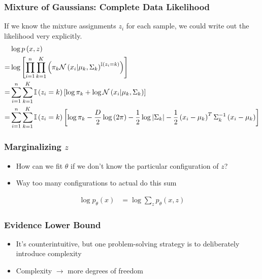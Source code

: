 \documentclass[10pt,mathserif]{beamer}
\begin{document}
\begin{frame}
  \frametitle{Mixture of Gaussians: Complete Data Likelihood}
  If we know the mixture assignments $z_i$ for each sample, we could write out
  the likelihood very explicitly.
  \begin{align*}
    &\log p\left(x, z\right) \\
    = &\log \left[\prod_{i = 1}^{n} \prod_{k = 1}^{K}
  \left(\pi_{k}\mathcal{N}\left(x_i \vert \mu_k, \Sigma_k\right)^{\mathbb{I}\left({z_i =
      k}\right)}\right)\right] \\
= &\sum_{i = 1}^{n} \sum_{k = 1}^{K} \mathbb{I}\left({z_i = k}\right) \left[\log \pi_{k} + \log
  \mathcal{N}\left(x_i \vert \mu_k, \Sigma_k\right)\right] \\
= &\sum_{i = 1}^{n} \sum_{k = 1}^{K} \mathbb{I}\left({z_i = k}\right) \left[\log \pi_{k}
  -\frac{D}{2}\log\left(2\pi\right) - \frac{1}{2}\log \left|\Sigma_k\right| -
  \frac{1}{2} \left(x_i - \mu_k\right)^{T}\Sigma^{-1}_{k} \left(x_i -
  \mu_k\right)\right]
  \end{align*}
\end{frame}

\begin{frame}
  \frametitle{Marginalizing $z$}
  \begin{itemize}
  \item How can we fit $\theta$ if we don't know the particular configuration of
    $z$?
  \item Way too many configurations to actual do this sum
  \end{itemize}
  \begin{align*}
    \log p_{\theta}\left(x\right) &= \log \sum_{z} p_{\theta}\left(x, z\right)
  \end{align*}
\end{frame}

\begin{frame}
  \frametitle{Evidence Lower Bound}
  \begin{itemize}
  \item It's counterintuitive, but one problem-solving strategy is to
    deliberately introduce complexity
  \item Complexity $\rightarrow$ more degrees of freedom
  \end{itemize}
\end{frame}
\end{document}
